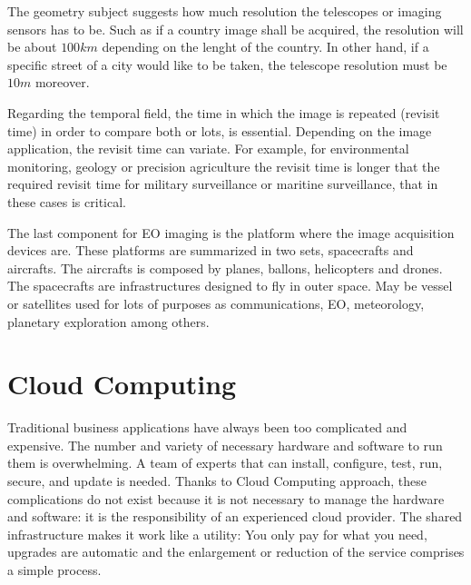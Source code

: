 
The geometry subject suggests how much resolution the
telescopes or imaging sensors has to be. Such as if a country image shall be acquired,
the resolution will be about $100km$ depending on the lenght of the country. In
other hand, if a specific street of a city would like to be taken, the telescope
resolution must be $10m$ moreover.

Regarding the temporal field, the time in which the image is repeated (revisit
time) in order
to compare both or lots, is essential. Depending on the image
application, the revisit time can variate. For example, for environmental
monitoring, geology or precision agriculture the revisit time is longer that the
required revisit time for military surveillance or maritine surveillance, that
in these cases is critical.

The last component for \ac{EO} imaging is the platform where the image
acquisition devices are. These platforms are summarized in two sets, spacecrafts and
aircrafts. The aircrafts is composed by planes, ballons, helicopters and
drones. The spacecrafts are infrastructures designed to fly in outer space. May
be vessel or satellites used for lots of purposes as communications, \ac{EO},
meteorology, planetary exploration among others. 

\section{Cloud Computing}

Traditional business applications have always been too complicated and
expensive. The number and variety of necessary hardware and software to run them
is overwhelming. A team of experts that can install, configure, test, run,
secure, and update is needed. 
Thanks to Cloud Computing approach, these
complications do not exist because it is not necessary to manage the hardware
and software: it is the responsibility of an experienced cloud provider. The
shared infrastructure makes it work like a utility: You only pay for what you
need, upgrades are automatic and the enlargement or reduction of the service
comprises a simple process.

